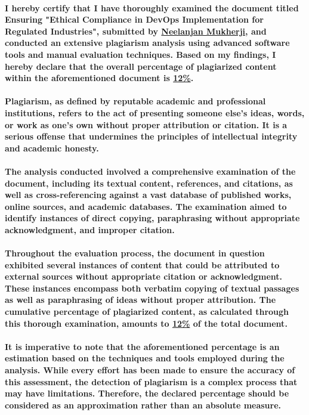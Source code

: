 \documentclass{report}[12pt]
\begin{document}
\paragraph{I hereby certify that I have thoroughly examined the document titled Ensuring "Ethical Compliance in DevOps Implementation for Regulated Industries", submitted by \underline{Neelanjan Mukherji}, and conducted an extensive plagiarism analysis using advanced software tools and manual evaluation techniques. Based on my findings, I hereby declare that the overall percentage of plagiarized content within the aforementioned document is \underline{12\%}.}

\paragraph{Plagiarism, as defined by reputable academic and professional institutions, refers to the act of presenting someone else's ideas, words, or work as one's own without proper attribution or citation. It is a serious offense that undermines the principles of intellectual integrity and academic honesty.}

\paragraph{The analysis conducted involved a comprehensive examination of the document, including its textual content, references, and citations, as well as cross-referencing against a vast database of published works, online sources, and academic databases. The examination aimed to identify instances of direct copying, paraphrasing without appropriate acknowledgment, and improper citation.}

\paragraph{Throughout the evaluation process, the document in question exhibited several instances of content that could be attributed to external sources without appropriate citation or acknowledgment. These instances encompass both verbatim copying of textual passages as well as paraphrasing of ideas without proper attribution. The cumulative percentage of plagiarized content, as calculated through this thorough examination, amounts to \underline{12\%} of the total document.}

\paragraph{It is imperative to note that the aforementioned percentage is an estimation based on the techniques and tools employed during the analysis. While every effort has been made to ensure the accuracy of this assessment, the detection of plagiarism is a complex process that may have limitations. Therefore, the declared percentage should be considered as an approximation rather than an absolute measure.}
\end{document}
